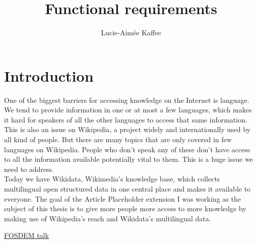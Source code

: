 \documentclass[11pt]{article}
\title {{Functional requirements}}
\author {Lucie-Aim\'{e}e Kaffee}
\date{}
\begin{document}
\section{Introduction}
One of the biggest barriers for accessing knowledge on the Internet is language. We tend to provide information in one or at most a few languages, which makes it hard for speakers of all the other languages to access that same information. This is also an issue on Wikipedia, a project widely and internationally used by all kind of people. But there are many topics that are only covered in few languages on Wikipedia. People who don’t speak any of these don’t have access to all the information available potentially vital to them. This is a huge issue we need to address. \\

Today we have Wikidata, Wikimedia’s knowledge base, which collects multilingual open structured data in one central place and makes it available to everyone. 
The goal of the Article Placeholder extension I was working as the subject of this thesis is to give more people more access to more knowledge by making use of Wikipedia’s reach and Wikidata’s multilingual data.


\href{https://www.fosdem.org/2016/schedule/event/increasing_access_to_free_and_open_knowledge_for_speakers_of_underserved_languages_on_wikipedia/}{FOSDEM talk}
\end{document}
